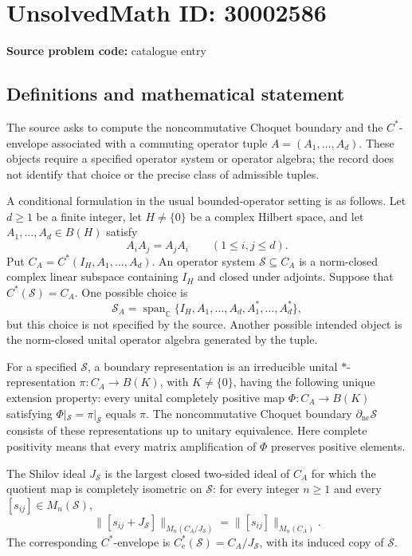 \documentclass[11pt]{article}
\newcommand{\C}{\mathbb{C}}
\begin{document}
\section*{UnsolvedMath ID: 30002586}
\textbf{Source problem code:} catalogue entry
\subsection{Definitions and mathematical statement}
The source asks to compute the noncommutative Choquet boundary and the \(C^*\)-envelope associated with a commuting operator tuple \(A=(A_1,\ldots,A_d)\). These objects require a specified operator system or operator algebra; the record does not identify that choice or the precise class of admissible tuples.

A conditional formulation in the usual bounded-operator setting is as follows. Let \(d\geq 1\) be a finite integer, let \(H\neq\{0\}\) be a complex Hilbert space, and let \(A_1,\ldots,A_d\in B(H)\) satisfy
\[
A_iA_j=A_jA_i\qquad(1\leq i,j\leq d).
\]
Put \(C_A=C^*(I_H,A_1,\ldots,A_d)\). An operator system \(\mathcal S\subseteq C_A\) is a norm-closed complex linear subspace containing \(I_H\) and closed under adjoints. Suppose that \(C^*(\mathcal S)=C_A\). One possible choice is
\[
\mathcal S_A=\operatorname{span}_{\C}\{I_H,A_1,\ldots,A_d,A_1^*,\ldots,A_d^*\},
\]
but this choice is not specified by the source. Another possible intended object is the norm-closed unital operator algebra generated by the tuple.

For a specified \(\mathcal S\), a boundary representation is an irreducible unital \(*\)-representation \(\pi:C_A\to B(K)\), with \(K\neq\{0\}\), having the following unique extension property: every unital completely positive map \(\Phi:C_A\to B(K)\) satisfying \(\Phi|_{\mathcal S}=\pi|_{\mathcal S}\) equals \(\pi\). The noncommutative Choquet boundary \(\partial_{\mathrm{nc}}\mathcal S\) consists of these representations up to unitary equivalence. Here complete positivity means that every matrix amplification of \(\Phi\) preserves positive elements.

The Shilov ideal \(J_{\mathcal S}\) is the largest closed two-sided ideal of \(C_A\) for which the quotient map is completely isometric on \(\mathcal S\): for every integer \(n\geq1\) and every \([s_{ij}]\in M_n(\mathcal S)\),
\[
\bigl\|[s_{ij}+J_{\mathcal S}]\bigr\|_{M_n(C_A/J_{\mathcal S})}
=\bigl\|[s_{ij}]\bigr\|_{M_n(C_A)}.
\]
The corresponding \(C^*\)-envelope is \(C^*_{\mathrm e}(\mathcal S)=C_A/J_{\mathcal S}\), with its induced copy of \(\mathcal S\).
\end{document}
